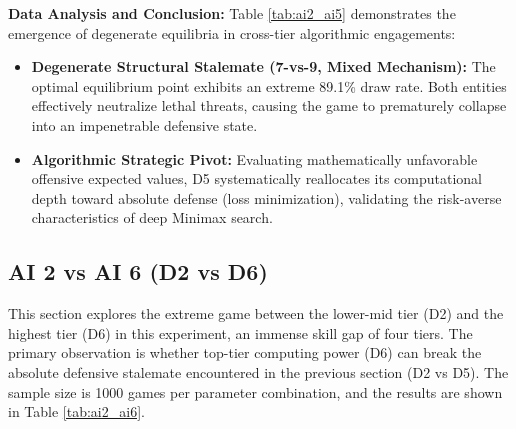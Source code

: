 \textbf{Data Analysis and Conclusion:} 
Table \ref{tab:ai2_ai5} demonstrates the emergence of degenerate equilibria in cross-tier algorithmic engagements:
\begin{itemize}
    \item \textbf{Degenerate Structural Stalemate (7-vs-9, Mixed Mechanism):} The optimal equilibrium point exhibits an extreme 89.1\% draw rate. Both entities effectively neutralize lethal threats, causing the game to prematurely collapse into an impenetrable defensive state.
    \item \textbf{Algorithmic Strategic Pivot:} Evaluating mathematically unfavorable offensive expected values, D5 systematically reallocates its computational depth toward absolute defense (loss minimization), validating the risk-averse characteristics of deep Minimax search.
\end{itemize}

\subsection{AI 2 vs AI 6 (D2 vs D6)}
\label{subsec:ai2_ai6}

This section explores the extreme game between the lower-mid tier (D2) and the highest tier (D6) in this experiment, an immense skill gap of four tiers. The primary observation is whether top-tier computing power (D6) can break the absolute defensive stalemate encountered in the previous section (D2 vs D5). The sample size is 1000 games per parameter combination, and the results are shown in Table \ref{tab:ai2_ai6}.

\begin{table}[htbp]
    \centering
    \caption{AI 2 vs AI 6 Simulation Data Distribution (Sample Size=1000)}
    \label{tab:ai2_ai6}
\end{table}

